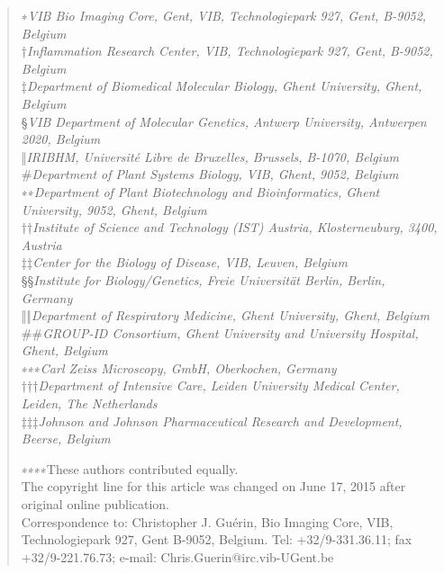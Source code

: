 \documentclass{article}
\begin{document}
\begin{quote}\small
\noindent ∗\textit{VIB Bio Imaging Core, Gent, VIB, Technologiepark 927, Gent, B-9052, Belgium}\\
†\textit{Inflammation Research Center, VIB, Technologiepark 927, Gent, B-9052, Belgium}\\
‡\textit{Department of Biomedical Molecular Biology, Ghent University, Ghent, Belgium}\\
§\textit{VIB Department of Molecular Genetics, Antwerp University, Antwerpen 2020, Belgium}\\
‖\textit{IRIBHM, Université Libre de Bruxelles, Brussels, B-1070, Belgium}\\
\#\textit{Department of Plant Systems Biology, VIB, Ghent, 9052, Belgium}\\
∗∗\textit{Department of Plant Biotechnology and Bioinformatics, Ghent University, 9052, Ghent, Belgium}\\
††\textit{Institute of Science and Technology (IST) Austria, Klosterneuburg, 3400, Austria}\\
‡‡\textit{Center for the Biology of Disease, VIB, Leuven, Belgium}\\
§§\textit{Institute for Biology/Genetics, Freie Universität Berlin, Berlin, Germany}\\
‖‖\textit{Department of Respiratory Medicine, Ghent University, Ghent, Belgium}\\
\#\#\textit{GROUP-ID Consortium, Ghent University and University Hospital, Ghent, Belgium}\\
∗∗∗\textit{Carl Zeiss Microscopy, GmbH, Oberkochen, Germany}\\
†††\textit{Department of Intensive Care, Leiden University Medical Center, Leiden, The Netherlands}\\
‡‡‡\textit{Johnson and Johnson Pharmaceutical Research and Development, Beerse, Belgium}

\medskip
\noindent ∗∗∗∗These authors contributed equally.\\
The copyright line for this article was changed on June 17, 2015 after original online publication.\\
Correspondence to: Christopher J. Guérin, Bio Imaging Core, VIB, Technologiepark 927, Gent B-9052, Belgium. Tel: +32/9-331.36.11; fax +32/9-221.76.73; e-mail: Chris.Guerin@irc.vib-UGent.be
\end{quote}
\end{document}
